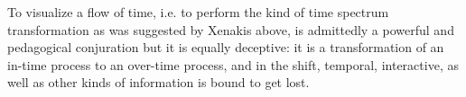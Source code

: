 To visualize a flow of time, i.e. to perform the kind of time spectrum transformation as was suggested by Xenakis above, is admittedly a powerful and pedagogical conjuration %
but it is equally deceptive: it is a transformation of an in-time process to an over-time process, and in the shift, temporal, interactive, as well as other kinds of information is bound to get lost.



